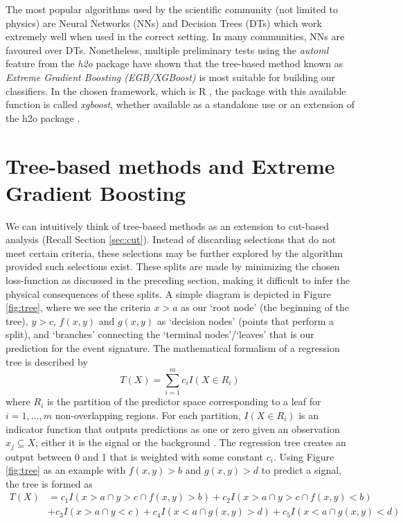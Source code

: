 The most popular algorithms used by the scientific community (not limited to physics) are Neural Networks (NNs) and Decision Trees (DTs) which work extremely well when used in the correct setting. In many communities, NNs are favoured over DTs. Nonetheless, multiple preliminary tests using the \textit{automl} feature from the \textit{h2o} package \cite{h2o} have shown that the tree-based method known as \textit{Extreme Gradient Boosting (EGB/XGBoost)} is most suitable for building our classifiers. In the chosen framework, which is R \cite{R}, the package with this available function is called \textit{xgboost}, whether available as a standalone use \cite{xgboost} or an extension of the h2o package \cite{h2o}.\\

\section{Tree-based methods and Extreme Gradient Boosting}
\label{sec:method}
We can intuitively think of tree-based methods as an extension to cut-based analysis (Recall Section \ref{sec:cut}). Instead of discarding selections that do not meet certain criteria, these selections may be further explored by the algorithm provided such selections exist. These splits are made by minimizing the chosen loss-function as discussed in the preceding section, making it difficult to infer the physical consequences of these splits. A simple diagram is depicted in Figure \ref{fig:tree}, where we see the criteria $x>a$ as our `root node' (the beginning of the tree), $y>c$, $f(x,y)$ and $g(x,y)$ as `decision nodes' (points that perform a split), and `branches' connecting the `terminal nodes'/`leaves' that is our prediction for the event signature. The mathematical formalism of a regression tree is described by
\begin{equation}
    T(X) = \sum_{i=1}^m c_i I(X\in R_i)
    \label{eq:DT}
\end{equation}
where $R_i$ is the partition of the predictor space corresponding to a leaf for $i=1,...,m$ non-overlapping regions. For each partition, $I(X\in R_i)$ is an indicator function that outputs predictions as one or zero given an observation $x_j\subseteq X$; either it is the signal or the background \cite{james2013introduction}. The regression tree creates an output between 0 and 1 that is weighted with some constant $c_i$. Using Figure \ref{fig:tree} as an example with $f(x,y)>b$ and $g(x,y)>d$ to predict a signal, the tree is formed as \\
\begin{equation}
    \begin{split}
        T(X) & = c_1I(x>a\cap y>c \cap f(x,y)>b)  
             + c_2I(x>a\cap y>c \cap f(x,y)<b)  \\
            & + c_3I(x>a\cap y<c) + c_4I(x<a \cap g(x,y)>d) + c_5I(x<a \cap g(x,y)<d)
    \end{split}
    \label{eq:DT_ex}
\end{equation}



